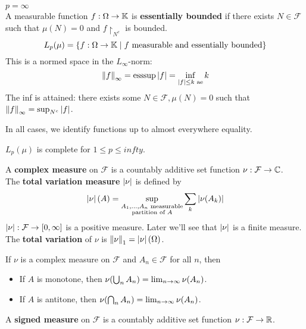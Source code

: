 \documentclass{article}
\begin{document}
$p = \infty$ \\
A measurable function $f : \Omega \rightarrow \mathbb K$ is {\bf essentially bounded} if there exists $N \in \mathcal F$ such that $\mu(N) = 0$ and $f\restriction_{N^c}$ is bounded.
$$L_p(\mu) = \{f : \Omega \rightarrow \mathbb K \mid f \text{ measurable and essentially bounded}\}$$
This is a normed space in the $L_\infty$-norm:
$$\left\lVert f\right\rVert_\infty = \operatorname{ess sup} \left\lvert f\right\rvert = \inf_{\left\lvert f\right\rvert \le k \text{ ae}} k$$
The inf is attained: there exists some $N \in \mathcal F, \mu(N) = 0$ such that $\left\lVert f\right\rVert_\infty = \sup_{N^c} \left\lvert f\right\rvert$.

In all cases, we identify functions up to almost everywhere equality.

\begin{nthm}
  $L_p(\mu)$ is complete for $1 \le p \le infty$.
\end{nthm}

\begin{defi}
  A {\bf complex measure} on $\mathcal F$ is a countably additive set function $\nu : \mathcal F \rightarrow \mathbb C$. \\
  The {\bf total variation measure} $\left\lvert \nu\right\rvert$ is defined by
  $$\left\lvert \nu\right\rvert(A) = \sup_{\substack{A_1, \dots, A_n \text{ measurable} \\ \text{partition of } A}} \sum_k \left\lvert \nu(A_k)\right\rvert$$
  $\left\lvert \nu\right\rvert : \mathcal F \rightarrow [0, \infty]$ is a positive measure. Later we'll see that $\left\lvert \nu\right\rvert$ is a finite measure. \\
  The {\bf total variation} of $\nu$ is $\left\lVert \nu\right\rVert_1 = \left\lvert \nu\right\rvert(\Omega)$.
\end{defi}

\begin{prop}
  If $\nu$ is a complex measure on $\mathcal F$ and $A_n \in \mathcal F$ for all $n$, then
  \begin{itemize}
    \item If $A$ is monotone, then $\nu(\bigcup_n A_n) = \lim_{n \rightarrow \infty} \nu(A_n)$.
    \item If $A$ is antitone, then $\nu(\bigcap_n A_n) = \lim_{n \rightarrow \infty} \nu(A_n)$.
  \end{itemize}
\end{prop}

\begin{defi}
  A {\bf signed measure} on $\mathcal F$ is a countably additive set function $\nu : \mathcal F \rightarrow \mathbb R$.
\end{defi}
\end{document}
